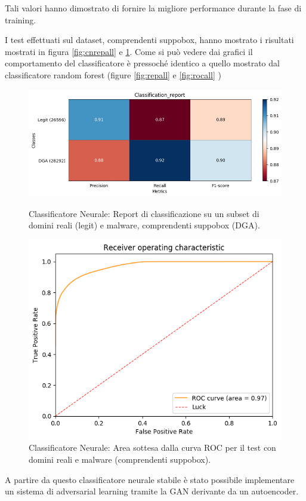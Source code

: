 Tali valori hanno dimostrato di fornire la migliore performance durante la fase di training.

I test effettuati sul dataset, comprendenti suppobox, hanno mostrato i risultati mostrati in figura \ref{fig:cnrepall} e \ref{fig:cnrocall}. Come si può vedere dai grafici il comportamento del classificatore è pressoché identico a quello mostrato dal classificatore random forest (figure \ref{fig:repall} e \ref{fig:rocall} )

\begin{figure}[!htbp]
    \centering
    \includegraphics[width=.85\columnwidth]{figures/clas_nn/class_rep.png}
    \caption{Classificatore Neurale: Report di classificazione su un subset di domini reali (legit) e malware, comprendenti suppobox (DGA).\label{fig:cnrepall}}

    \centering
    \includegraphics[width=.85\columnwidth]{figures/clas_nn/roc_plot.png}
    \caption{Classificatore Neurale: Area sottesa dalla curva ROC per il test con domini reali e malware (comprendenti suppobox).\label{fig:cnrocall}}
\end{figure}

A partire da questo classificatore neurale stabile è stato possibile implementare un sistema di adversarial learning tramite la GAN derivante da un autoencoder. 

